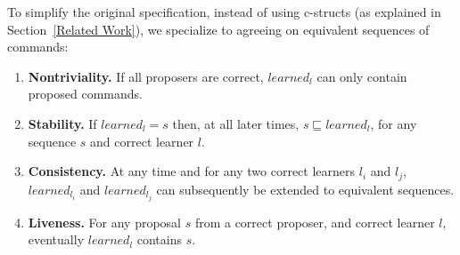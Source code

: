 To simplify the original specification, instead of using c-structs (as explained in Section~\ref{Related Work}), we specialize to agreeing on equivalent sequences of commands:\par
%
\begin{enumerate}
	\item \textbf{Nontriviality.} If all proposers are correct, $learned_l$ can only contain proposed commands.
	\item \textbf{Stability.} If $learned_l = s$ then, at all later times, $s \sqsubseteq learned_l$, for any sequence $s$ and correct learner $l$.
	\item \textbf{Consistency.} At any time and for any two correct learners $l_i$ and $l_j$, $learned_{l_i}$ and $learned_{l_j}$ can subsequently be extended to equivalent sequences.
	\item \textbf{Liveness.} For any proposal $s$ from a correct proposer, and correct learner $l$, eventually $learned_l$ contains $s$.
\end{enumerate}
